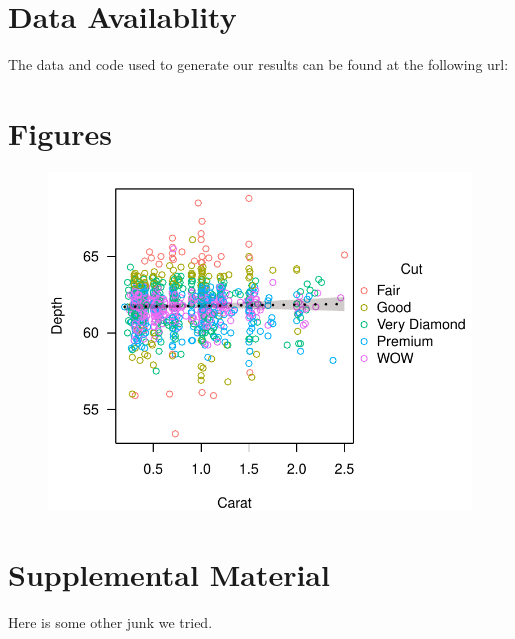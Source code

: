 \documentclass[11pt,letterpaper]{article} %
\begin{document}
\section*{Data Availablity}
The data and code used to generate our results can be found at the following url:





\pagebreak
\section*{Figures}

\begin{figure}[h!] %
  \centering
    \includegraphics[width=1\textwidth]{depth_by_carat.pdf}
    \caption{\protect}
  \label{depth_by_carat} %
\end{figure}


\pagebreak
\section*{Supplemental Material}

Here is some other junk we tried.
\end{document}
